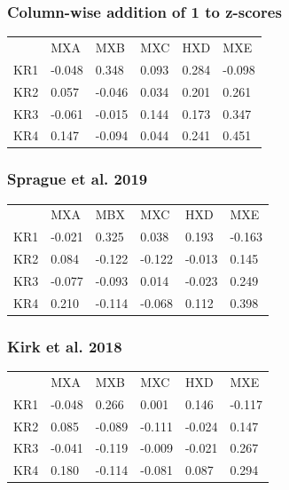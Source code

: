 \subsubsection{Column-wise addition of 1 to z-scores}
\begin{table}[h!]
\begin{tabular}{llllll}
&MXA & MXB                  & MXC                   & HXD                 & MXE                                      \\
KR1 & -0.048 & 0.348    & 0.093 & 0.284  & -0.098 \\
KR2 & 0.057  & -0.046 & 0.034 & 0.201 & 0.261  \\
KR3 & -0.061 & -0.015 & 0.144 & 0.173 & 0.347  \\
KR4 & 0.147   & -0.094  & 0.044 & 0.241 & 0.451 
\end{tabular}
\end{table}

\subsubsection{Sprague et al. 2019}

\begin{table}[h!]
\begin{tabular}{llllll}
&MXA & MBX                  & MXC                  & HXD                  & MXE                                        \\
KR1 & -0.021 & 0.325   & 0.038 & 0.193   & -0.163 \\
KR2 & 0.084  & -0.122  & -0.122 & -0.013 & 0.145  \\
KR3 & -0.077   & -0.093 & 0.014 & -0.023 & 0.249   \\
KR4 & 0.210   & -0.114 & -0.068 & 0.112   & 0.398
\end{tabular}
\end{table}

\subsubsection{Kirk et al. 2018}

\begin{table}[h!]
\begin{tabular}{llllll}
&MXA & MXB                   & MXC                  & HXD                   & MXE                                         \\
KR1 & -0.048 & 0.266   & 0.001 & 0.146    & -0.117 \\
KR2 & 0.085   & -0.089  & -0.111  & -0.024 & 0.147  \\
KR3 & -0.041 & -0.119   & -0.009 & -0.021 & 0.267   \\
KR4 & 0.180   & -0.114 & -0.081  & 0.087   & 0.294 
\end{tabular}
\end{table}

